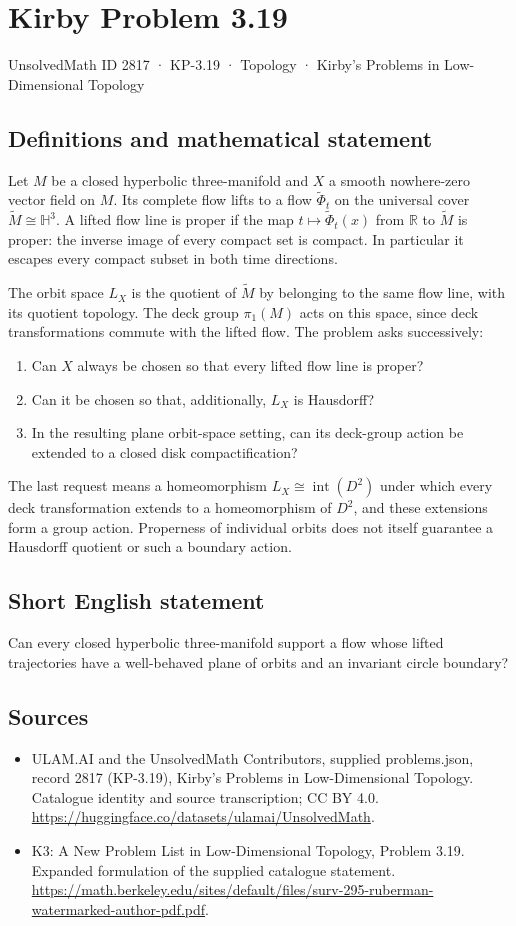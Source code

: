 \documentclass[11pt,a4paper]{article}
\begin{document}
\section*{Kirby Problem 3.19}\label{2817}
{\small UnsolvedMath ID 2817 · KP-3.19 · Topology · Kirby's Problems in Low-Dimensional Topology}
\subsection{Definitions and mathematical statement}
Let $M$ be a closed hyperbolic three-manifold and $X$ a smooth nowhere-zero
vector field on $M$. Its complete flow lifts to a flow $\widetilde\Phi_t$
on the universal cover $\widetilde M\cong\mathbb H^3$. A lifted flow line
is proper if the map $t\mapsto\widetilde\Phi_t(x)$ from $\mathbb R$ to
$\widetilde M$ is proper: the inverse image of every compact set is compact.
In particular it escapes every compact subset in both time directions.

The orbit space $L_X$ is the quotient of $\widetilde M$ by belonging to the
same flow line, with its quotient topology. The deck group $\pi_1(M)$ acts
on this space, since deck transformations commute with the lifted flow.
The problem asks successively:
\begin{enumerate}
\item Can $X$ always be chosen so that every lifted flow line is proper?
\item Can it be chosen so that, additionally, $L_X$ is Hausdorff?
\item In the resulting plane orbit-space setting, can its deck-group action
be extended to a closed disk compactification?
\end{enumerate}
The last request means a homeomorphism $L_X\cong\operatorname{int}(D^2)$
under which every deck transformation extends to a homeomorphism of $D^2$,
and these extensions form a group action. Properness of individual orbits
does not itself guarantee a Hausdorff quotient or such a boundary action.
\subsection{Short English statement}
Can every closed hyperbolic three-manifold support a flow whose lifted trajectories have a well-behaved plane of orbits and an invariant circle boundary?
\subsection{Sources}
\begin{itemize}
\item[S1] ULAM.AI and the UnsolvedMath Contributors, supplied problems.json, record 2817 (KP-3.19), Kirby's Problems in Low-Dimensional Topology. Catalogue identity and source transcription; CC BY 4.0.
\url{https://huggingface.co/datasets/ulamai/UnsolvedMath}.
\item[S2] K3: A New Problem List in Low-Dimensional Topology, Problem 3.19. Expanded formulation of the supplied catalogue statement.
\url{https://math.berkeley.edu/sites/default/files/surv-295-ruberman-watermarked-author-pdf.pdf}.
\end{itemize}
\end{document}
